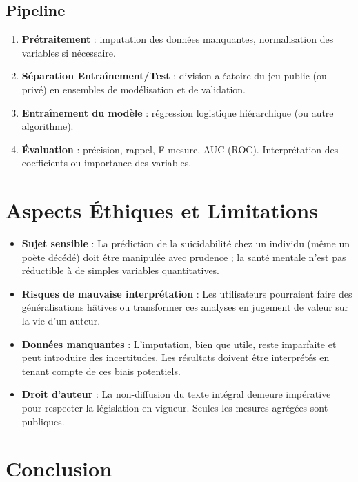 \documentclass[12pt,a4paper]{article}
\begin{document}
	\subsection{Pipeline}
	\begin{enumerate}
		\item \textbf{Prétraitement} : imputation des données manquantes, normalisation 
		des variables si nécessaire.
		\item \textbf{Séparation Entraînement/Test} : division aléatoire du jeu public (ou privé) 
		en ensembles de modélisation et de validation.
		\item \textbf{Entraînement du modèle} : régression logistique hiérarchique 
		(ou autre algorithme).
		\item \textbf{Évaluation} : précision, rappel, F-mesure, AUC (ROC). 
		Interprétation des coefficients ou importance des variables.
	\end{enumerate}
	
	\section{Aspects Éthiques et Limitations}
	\label{sec:ethics}
	
	\begin{itemize}
		\item \textbf{Sujet sensible} : La prédiction de la suicidabilité chez un individu 
		(même un poète décédé) doit être manipulée avec prudence ; la santé mentale 
		n’est pas réductible à de simples variables quantitatives.
		\item \textbf{Risques de mauvaise interprétation} : Les utilisateurs pourraient 
		faire des généralisations hâtives ou transformer ces analyses en jugement 
		de valeur sur la vie d’un auteur.
		\item \textbf{Données manquantes} : L’imputation, bien que utile, reste imparfaite 
		et peut introduire des incertitudes. Les résultats doivent être interprétés 
		en tenant compte de ces biais potentiels.
		\item \textbf{Droit d’auteur} : La non-diffusion du texte intégral demeure impérative 
		pour respecter la législation en vigueur. Seules les mesures agrégées sont publiques.
	\end{itemize}
	
	\section{Conclusion}
	\label{sec:conclusion}
	
\end{document}
